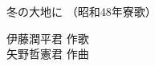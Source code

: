 \documentclass[10pt,b5j]{tarticle} %
\begin{document}
\begin{minipage}[c]{0.7\hsize} %
    \begin{center}
        {\LARGE
            冬の大地に %
        }
        {\small 
            （昭和48年寮歌） %
        }
    \end{center}
\end{minipage}
\begin{minipage}[c]{0.3\hsize} %
    \begin{flushright} %
        伊藤潤平君 作歌\\矢野哲憲君 作曲 %
    \end{flushright}
\end{minipage}
\end{document}
